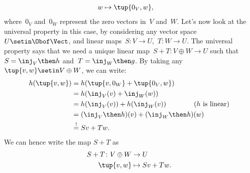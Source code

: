 {\begin{example}
\begin{equation*}
\begin{aligned}
                w               & \mapsto \tup{0_V,w},
            \end{aligned}
        \end{equation*}
        where~$0_V$ and~$0_W$ represent the zero vectors in~$V$ and~$W$.
        Let's now look at the universal property in this case, by considering any vector space $U\setin \Obof\Vect$, and linear maps~$S\colon V\to U$,~$T\colon W\to U$.
        The universal property says that we need a unique linear map~$S+T\colon V\oplus W \to U$ such that~$S=\inj_V\then h$ and~$T=\inj_W\then g$.
        By taking any~$\tup{v,w}\setin V\oplus W$, we can write:
        \begin{equation*}
            \begin{aligned}
                h(\tup{v,w}) & =h(\tup{v,0_W}+\tup{0_V,w}) \\
                             & =h(\inj_V(v)+\inj_W(w)) \\
                             & =h(\inj_V(v))+h(\inj_W(v)) \qquad \qquad (h \text{ is linear}) \\
                             & =(\inj_V\then h)(v)+(\inj_W\then h)(w) \\
                             & \overset{!
                }{=}
                Sv+Tw.
            \end{aligned}
        \end{equation*}
        We can hence write the map $S+T$ as
        \begin{equation*}
            \begin{aligned}
                S+T\colon V\oplus W & \to U \\
                \tup{v,w}           & \mapsto Sv+Tw.
            \end{aligned}
        \end{equation*}
    \end{example}
}
